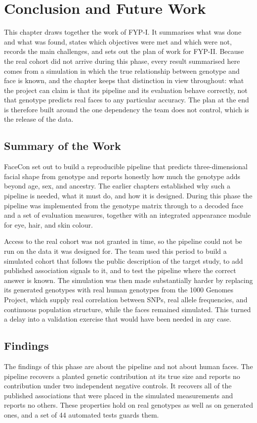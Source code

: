 \chapter{Conclusion and Future Work}
\label{ch:conclusion}
This chapter draws together the work of FYP-I. It summarises what was done and what was found, states which objectives were met and which were not, records the main challenges, and sets out the plan of work for FYP-II. Because the real cohort did not arrive during this phase, every result summarised here comes from a simulation in which the true relationship between genotype and face is known, and the chapter keeps that distinction in view throughout: what the project can claim is that its pipeline and its evaluation behave correctly, not that genotype predicts real faces to any particular accuracy. The plan at the end is therefore built around the one dependency the team does not control, which is the release of the data.

\section{Summary of the Work}
FaceCon set out to build a reproducible pipeline that predicts three-dimensional facial shape from genotype and reports honestly how much the genotype adds beyond age, sex, and ancestry. The earlier chapters established why such a pipeline is needed, what it must do, and how it is designed. During this phase the pipeline was implemented from the genotype matrix through to a decoded face and a set of evaluation measures, together with an integrated appearance module for eye, hair, and skin colour.

Access to the real cohort was not granted in time, so the pipeline could not be run on the data it was designed for. The team used this period to build a simulated cohort that follows the public description of the target study, to add published association signals to it, and to test the pipeline where the correct answer is known. The simulation was then made substantially harder by replacing its generated genotypes with real human genotypes from the 1000 Genomes Project, which supply real correlation between SNPs, real allele frequencies, and continuous population structure, while the faces remained simulated. This turned a delay into a validation exercise that would have been needed in any case.

\section{Findings}
The findings of this phase are about the pipeline and not about human faces. The pipeline recovers a planted genetic contribution at its true size and reports no contribution under two independent negative controls. It recovers all of the published associations that were placed in the simulated measurements and reports no others. These properties hold on real genotypes as well as on generated ones, and a set of 44 automated tests guards them.

